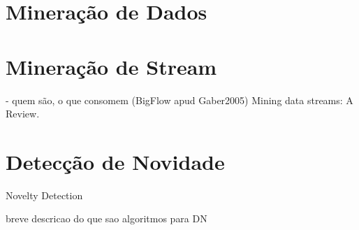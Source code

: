 


\section{Mineração de Dados}
\section{Mineração de Stream}

- quem são, o que consomem
(BigFlow apud Gaber2005) Mining data streams: A Review.

\section{Detecção de Novidade}

Novelty Detection

breve descricao do que sao algoritmos para DN

